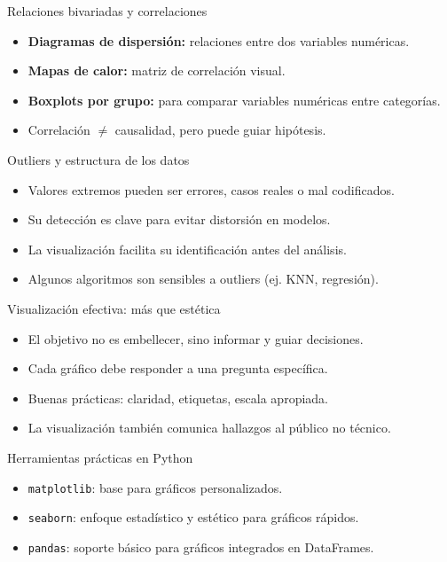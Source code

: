 \documentclass{beamer}
\begin{document}
\begin{frame}{Relaciones bivariadas y correlaciones}
\begin{itemize}
    \item \textbf{Diagramas de dispersión:} relaciones entre dos variables numéricas.
    \item \textbf{Mapas de calor:} matriz de correlación visual.
    \item \textbf{Boxplots por grupo:} para comparar variables numéricas entre categorías.
    \item Correlación $\neq$ causalidad, pero puede guiar hipótesis.
\end{itemize}
\end{frame}

\begin{frame}{Outliers y estructura de los datos}
\begin{itemize}
    \item Valores extremos pueden ser errores, casos reales o mal codificados.
    \item Su detección es clave para evitar distorsión en modelos.
    \item La visualización facilita su identificación antes del análisis.
    \item Algunos algoritmos son sensibles a outliers (ej. KNN, regresión).
\end{itemize}
\end{frame}

\begin{frame}{Visualización efectiva: más que estética}
\begin{itemize}
    \item El objetivo no es embellecer, sino informar y guiar decisiones.
    \item Cada gráfico debe responder a una pregunta específica.
    \item Buenas prácticas: claridad, etiquetas, escala apropiada.
    \item La visualización también comunica hallazgos al público no técnico.
\end{itemize}
\end{frame}

\begin{frame}{Herramientas prácticas en Python}
\begin{itemize}
    \item \texttt{matplotlib}: base para gráficos personalizados.
    \item \texttt{seaborn}: enfoque estadístico y estético para gráficos rápidos.
    \item \texttt{pandas}: soporte básico para gráficos integrados en DataFrames.
\end{itemize}
\end{frame}
\end{document}
